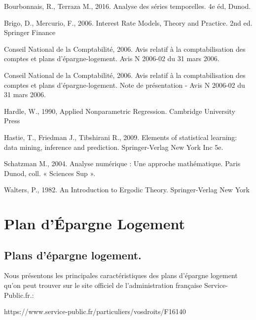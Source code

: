 \documentclass[12pt, a4paper]{book}
\begin{document}
{\begin{thebibliography}{99}
 Bourbonnais, R.,  Terraza M., 2016. Analyse des séries temporelles. 4e éd, Dunod. 

 Brigo, D., Mercurio, F., 2006. Interest Rate Models, Theory and Practice. 2nd ed. Springer Finance

 Conseil National de la Comptabilité, 2006. Avis relatif à la comptabilisation des comptes
et plans d'épargne-logement. Avis N 2006-02 du 31 mars 2006.

 Conseil National de la Comptabilité, 2006. Avis relatif à la comptabilisation des comptes
et plans d'épargne-logement. Note de présentation - Avis N 2006-02 du 31 mars 2006.

 Hardle, W., 1990, Applied Nonparametric Regression. Cambridge University Press

 Hastie, T., Friedman J., Tibshirani R.,  2009. Elements of statistical learning: data mining, inference and prediction. Springer-Verlag New York Inc 5e.

 Schatzman M., 2004. Analyse numérique : Une approche mathématique. Paris Dunod, coll. « Sciences Sup ».

 Walters, P., 1982. An Introduction to Ergodic Theory. Springer-Verlag New York 
	 

	 
\end{thebibliography}


\appendix



\chapter{Plan d'Épargne Logement}
\label{app_pel}


\section{Plans d’épargne logement.}

Nous présentons les principales caractéristiques des plans d'épargne logement qu'on peut trouver sur le site officiel de l'administration française Service-Public.fr.:

 https://www.service-public.fr/particuliers/vosdroits/F16140

}
\end{document}
